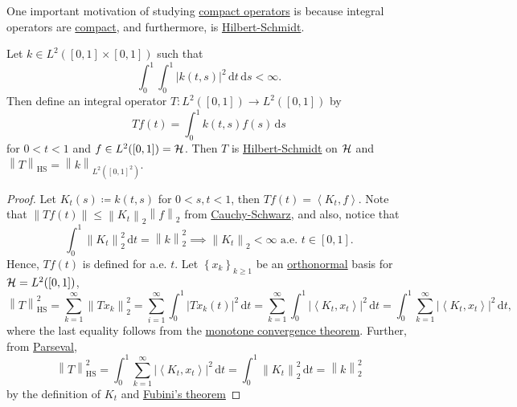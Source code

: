 One important motivation of studying \hyperref[def:compact-op]{compact operators} is because integral operators are \hyperref[def:compact-op]{compact}, and furthermore, is \hyperref[def:Hilbert-Schmidt-op]{Hilbert-Schmidt}.
\begin{proposition}\label{prop:Hilbert-Schmidt-integral-op}
	Let \(k\in L^2([0, 1]\times [0, 1])\) such that
	\[
		\int _0^1 \int _0^1 \left\vert k(t, s) \right\vert ^{2} \,\mathrm{d} t\,\mathrm{d} s < \infty.
	\]
	Then define an integral operator \(T\colon L^2([0, 1])\to L^2([0, 1])\) by
	\[
		Tf(t) = \int _0^1 k(t, s)f(s)\,\mathrm{d} s
	\]
	for \(0 < t < 1\) and \(f\in L^2([0, 1])= \mathcal{\MakeUppercase{h}} \). Then \(T\) is \hyperref[def:Hilbert-Schmidt-op]{Hilbert-Schmidt} on \(\mathcal{\MakeUppercase{h}} \) and \(\left\lVert T\right\rVert _{\mathrm{HS} }= \left\lVert k\right\rVert _{L^2([0, 1]^2)}\).
\end{proposition}
\begin{proof}
	Let \(K_t(s) \coloneqq k(t, s)\) for \(0<s, t<1\), then \(Tf(t) = \left\langle K_t, f \right\rangle \). Note that \(\left\lVert Tf(t)\right\rVert \leq \left\lVert K_t\right\rVert _2 \left\lVert f\right\rVert _2\) from \hyperref[thm:Cauchy-Schwarz-ineq]{Cauchy-Schwarz}, and also, notice that
	\[
		\int_{0}^{1} \left\lVert K_t\right\rVert ^2_2 \,\mathrm{d}t = \left\lVert k\right\rVert _2^2 \implies \left\lVert K_t\right\rVert _2<\infty \text{ a.e. }t\in [0,1].
	\]
	Hence, \(Tf(t)\) is defined for a.e. \(t\). Let \(\left\{ x_k \right\} _{k \geq 1}\) be an \hyperref[def:orthonormal-system]{orthonormal} basis for \(\mathcal{\MakeUppercase{h}} =L^2([0, 1])\),
	\[
		\left\lVert T\right\rVert ^2 _{\mathrm{HS} }
		= \sum_{k=1}^{\infty} \left\lVert T x_{k} \right\rVert _2^2
		= \sum_{i=1}^{\infty} \int _0^1 \left\vert T x_{k} (t) \right\vert ^2 \,\mathrm{d} t
		= \sum_{k=1}^{\infty} \int _0^1 \left\vert \left\langle K_{t} , x_{t}  \right\rangle  \right\vert ^2 \,\mathrm{d} t
		= \int _0^1 \sum_{k=1}^{\infty}\left\vert \left\langle K_{t} , x_{t}  \right\rangle  \right\vert ^2 \,\mathrm{d} t ,
	\]
	where the last equality follows from the \href{https://en.wikipedia.org/wiki/Monotone_convergence_theorem}{monotone convergence theorem}. Further, from \hyperref[col:Parseval]{Parseval},
	\[
		\left\lVert T\right\rVert ^2 _{\mathrm{HS} }
		= \int _0^1 \sum_{k=1}^{\infty}\left\vert \left\langle K_{t} , x_{t}  \right\rangle  \right\vert ^2 \,\mathrm{d} t
		= \int _0^1 \left\lVert K_t\right\rVert _2^2 \,\mathrm{d} t
		= \left\lVert k\right\rVert _2^2
	\]
	by the definition of \(K_t\) and \href{https://en.wikipedia.org/wiki/Fubini's_theorem}{Fubini's theorem}
\end{proof}


